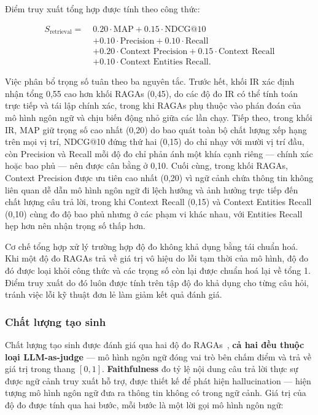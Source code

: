 Điểm truy xuất tổng hợp được tính theo công thức:

\begin{equation}
\begin{aligned}
S_{\text{retrieval}} =\;& 0.20 \cdot \text{MAP}
  + 0.15 \cdot \text{NDCG@10} \\
& + 0.10 \cdot \text{Precision}
  + 0.10 \cdot \text{Recall} \\
& + 0.20 \cdot \text{Context Precision}
  + 0.15 \cdot \text{Context Recall} \\
& + 0.10 \cdot \text{Context Entities Recall}.
\end{aligned}
\end{equation}

Việc phân bổ trọng số tuân theo ba nguyên tắc. Trước hết, khối IR xác định nhận tổng 0,55 cao hơn khối RAGAs (0,45), do các độ đo IR có thể tính toán trực tiếp và tái lập chính xác, trong khi RAGAs phụ thuộc vào phán đoán của mô hình ngôn ngữ và chịu biến động nhỏ giữa các lần chạy. Tiếp theo, trong khối IR, MAP giữ trọng số cao nhất (0,20) do bao quát toàn bộ chất lượng xếp hạng trên mọi vị trí, NDCG@10 đứng thứ hai (0,15) do chỉ nhạy với mười vị trí đầu, còn Precision và Recall mỗi độ đo chỉ phản ánh một khía cạnh riêng --- chính xác hoặc bao phủ --- nên được cân bằng ở 0,10. Cuối cùng, trong khối RAGAs, Context Precision được ưu tiên cao nhất (0,20) vì ngữ cảnh chứa thông tin không liên quan dễ dẫn mô hình ngôn ngữ đi lệch hướng và ảnh hưởng trực tiếp đến chất lượng câu trả lời, trong khi Context Recall (0,15) và Context Entities Recall (0,10) cùng đo độ bao phủ nhưng ở các phạm vi khác nhau, với Entities Recall hẹp hơn nên nhận trọng số thấp hơn.

Cơ chế tổng hợp xử lý trường hợp độ đo không khả dụng bằng tái chuẩn hoá. Khi một độ đo RAGAs trả về giá trị vô hiệu do lỗi tạm thời của mô hình, độ đo đó được loại khỏi công thức và các trọng số còn lại được chuẩn hoá lại về tổng 1. Điểm truy xuất do đó luôn được tính trên tập độ đo khả dụng cho từng câu hỏi, tránh việc lỗi kỹ thuật đơn lẻ làm giảm kết quả đánh giá.

\subsubsection{Chất lượng tạo sinh}

Chất lượng tạo sinh được đánh giá qua hai độ đo RAGAs~\cite{es2023ragas}, \textbf{cả hai đều thuộc loại LLM-as-judge} --- mô hình ngôn ngữ đóng vai trò bên chấm điểm và trả về giá trị trong thang $[0, 1]$. \textbf{Faithfulness} đo tỷ lệ nội dung câu trả lời thực sự được ngữ cảnh truy xuất hỗ trợ, được thiết kế để phát hiện hallucination --- hiện tượng mô hình ngôn ngữ đưa ra thông tin không có trong ngữ cảnh. Giá trị của độ đo được tính qua hai bước, mỗi bước là một lời gọi mô hình ngôn ngữ:

